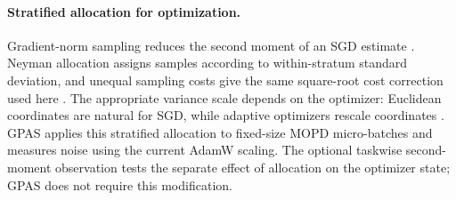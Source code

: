 \paragraph{Stratified allocation for optimization.}
Gradient-norm sampling reduces the second moment of an SGD estimate
\citep{alain2015variancereductionsgddistributed,
katharopoulos2018samplescreatedequaldeep}. Neyman allocation assigns samples
according to within-stratum standard deviation, and unequal sampling costs give
the same square-root cost correction used here
\citep{neyman1934representative,cochran1977sampling,mohri2026costawarelearning}.
The appropriate variance scale depends on the optimizer: Euclidean coordinates
are natural for SGD, while adaptive optimizers rescale coordinates
\citep{lahire2023nonuniformadaptive}. GPAS applies this stratified allocation to
fixed-size MOPD micro-batches and measures noise using the current AdamW
scaling. The optional taskwise second-moment observation tests the separate
effect of allocation on the optimizer state; GPAS does not require this
modification.
